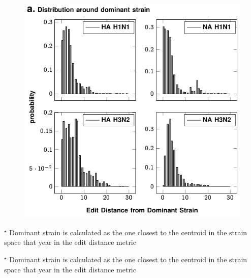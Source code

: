 \ifFIGS
\begin{figure}[!ht]
  \centering
  \tikzexternalenable

  \iftikzX
    
  \else
  \includegraphics[width=.6\textwidth]{Figures/External/dom.pdf}
  \vspace{0pt}
  \fi
  
\vspace{0pt}

\label{figdom}
\end{figure}
\else
{}\label{figdom}
\fi





\begin{table}[!ht]\centering
{}\label{tabrec2}

\sffamily\fontsize{7}{8}\selectfont


\flushleft

\fontsize{7}{7}\selectfont
$^\star$ Dominant strain is calculated as the one closest to the centroid in the strain space that year in the edit distance metric
\end{table}

\begin{table}[!ht]\centering
{}\label{tabrec3}

\sffamily\fontsize{7}{8}\selectfont


\flushleft

\fontsize{7}{7}\selectfont
$^\star$ Dominant strain is calculated as the one closest to the centroid in the strain space that year in the edit distance metric
\end{table}


